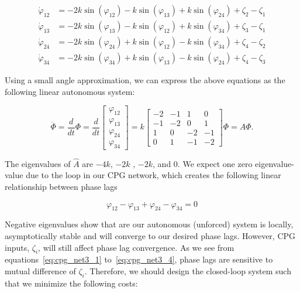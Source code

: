 \documentclass{article}
\begin{document}
\begin{align}
	\dot\varphi_{12}&= -2k\sin \left(\varphi_{12}\right)-k\sin\left(\varphi_{13}\right)+ k\sin\left(\varphi_{24}\right) + \zeta_2-\zeta_1 \label{eq:cpg_net3_1}\\
	\dot\varphi_{13}&= -2k\sin \left(\varphi_{13}\right)-k\sin\left(\varphi_{12}\right)+ k\sin\left(\varphi_{34}\right) + \zeta_3-\zeta_1\\
	\dot\varphi_{24}&= -2k\sin \left(\varphi_{24}\right)+k\sin\left(\varphi_{12}\right)- k\sin\left(\varphi_{34}\right) + \zeta_4-\zeta_2\\
	\dot\varphi_{34}&= -2k\sin \left(\varphi_{34}\right)+k\sin\left(\varphi_{13}\right)- k\sin\left(\varphi_{24}\right) + \zeta_4-\zeta_3 \label{eq:cpg_net3_4}
\end{align}

Using a small angle approximation,  we can express the above equations as the following linear autonomous system:

\begin{equation}
  	\dot{\Phi} = \frac{d}{dt} \Phi =\frac{d}{dt}
  	\left[\begin{array}{c}\varphi_{12} \\ \varphi_{13} \\ \varphi_{24} \\ \varphi_{34}\end{array}\right]
  	=k\left[ \begin{array}{rrrr}
	-2 & -1 &  1 &  0   \\
	-1 & -2 &  0 &  1  \\
	 1 &  0 & -2 & -1   \\
	 0 &  1 & -1 & -2 
	\end{array} \right] \Phi = \hat{A}\Phi.
\end{equation}

The eigenvalues of $\hat{A}$ are $-4k$, $-2k$ , $-2k$, and $0$. We expect one zero eigenvalue-value due to the loop in our CPG network, which creates the following linear relationship between phase lags

\begin{equation}
	\varphi_{12} - \varphi_{13} + \varphi_{24} - \varphi_{34} = 0
\end{equation}

Negative eigenvalues show that are our autonomous (unforced) system is locally, asymptotically stable and will converge to our desired phase lags. However, CPG inputs, $\zeta_i$, will still affect phase lag convergence. As we see from equations~\ref{eq:cpg_net3_1} to~\ref{eq:cpg_net3_4}, phase lags are sensitive to mutual difference of $\zeta_i$. Therefore, we should design the closed-loop system such that we minimize the following costs:
\end{document}
